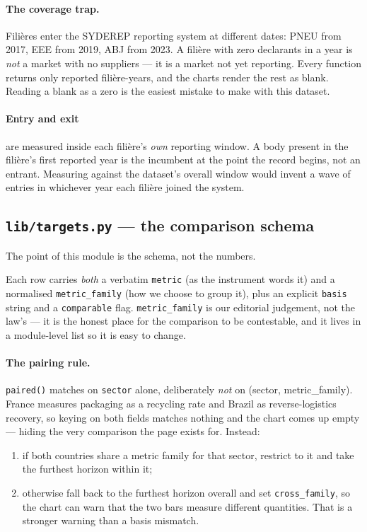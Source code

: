 \documentclass[11pt,a4paper]{article}
\newcommand{\file}[1]{\texttt{#1}}
\begin{document}
\paragraph{The coverage trap.} Filières enter the SYDEREP reporting system at
different dates: PNEU from 2017, EEE from 2019, ABJ from 2023. A filière with
zero declarants in a year is \emph{not} a market with no suppliers --- it is a
market not yet reporting. Every function returns only reported filière-years,
and the charts render the rest as blank. Reading a blank as a zero is the
easiest mistake to make with this dataset.

\paragraph{Entry and exit} are measured inside each filière's \emph{own}
reporting window. A body present in the filière's first reported year is the
incumbent at the point the record begins, not an entrant. Measuring against the
dataset's overall window would invent a wave of entries in whichever year each
filière joined the system.

\subsection{\file{lib/targets.py} --- the comparison schema}

The point of this module is the schema, not the numbers.

Each row carries \emph{both} a verbatim \file{metric} (as the instrument words
it) and a normalised \file{metric\_family} (how we choose to group it), plus an
explicit \file{basis} string and a \file{comparable} flag.
\file{metric\_family} is our editorial judgement, not the law's --- it is the
honest place for the comparison to be contestable, and it lives in a
module-level list so it is easy to change.

\paragraph{The pairing rule.} \file{paired()} matches on \file{sector} alone,
deliberately \emph{not} on (sector, metric\_family). France measures packaging
as a recycling rate and Brazil as reverse-logistics recovery, so keying on both
fields matches nothing and the chart comes up empty --- hiding the very
comparison the page exists for. Instead:

\begin{enumerate}
  \item if both countries share a metric family for that sector, restrict to it
        and take the furthest horizon within it;
  \item otherwise fall back to the furthest horizon overall and set
        \file{cross\_family}, so the chart can warn that the two bars measure
        different quantities. That is a stronger warning than a basis mismatch.
\end{enumerate}
\end{document}
